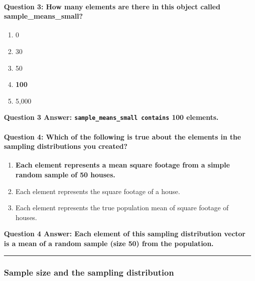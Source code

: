 \documentclass[]{article}
\begin{document}
\paragraph{Question 3: How many elements are there in this object called
sample\_means\_small?}\label{question-3-how-many-elements-are-there-in-this-object-called-sampleux5fmeansux5fsmall}

\begin{enumerate}
\def\labelenumi{\Alph{enumi})}
\itemsep1pt\parskip0pt
\item
  0
\item
  30
\item
  50
\item
  \textbf{100}
\item
  5,000
\end{enumerate}

\textbf{Question 3 Answer: \texttt{sample\_means\_small contains} 100
elements.}

\paragraph{Question 4: Which of the following is true about the elements
in the sampling distributions you
created?}\label{question-4-which-of-the-following-is-true-about-the-elements-in-the-sampling-distributions-you-created}

\begin{enumerate}
\def\labelenumi{\Alph{enumi})}
\itemsep1pt\parskip0pt
\item
  \textbf{Each element represents a mean square footage from a simple
  random sample of 50 houses.}
\item
  Each element represents the square footage of a house.
\item
  Each element represents the true population mean of square footage of
  houses.
\end{enumerate}

\textbf{Question 4 Answer: Each element of this sampling distribution
vector is a mean of a random sample (size 50) from the population.}

\begin{center}\rule{0.5\linewidth}{\linethickness}\end{center}

\subsubsection{Sample size and the sampling
distribution}\label{sample-size-and-the-sampling-distribution}
\end{document}

